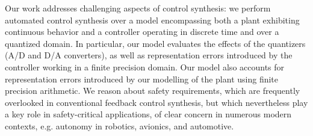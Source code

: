 

Our work addresses challenging aspects of control synthesis:  
we perform automated control synthesis over a model encompassing both a plant exhibiting continuous behavior  
and a controller operating in discrete time and over a quantized domain.  
In particular, our model evaluates the effects of the quantizers (A/D and D/A
converters), as well as representation errors introduced by the controller working  %
in a finite precision domain. Our model also accounts for representation errors introduced
by our modelling of the plant using finite precision arithmetic. 
We reason about safety requirements, which are frequently overlooked in conventional feedback control synthesis, 
but which nevertheless play a key role in safety-critical applications, of clear concern in numerous modern contexts, 
e.g. autonomy in robotics, avionics, and automotive.  

